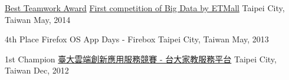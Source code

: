 

\begin{cvhonors}


  \cvhonor
    {\href{https://www.slideshare.net/evenchange4/cb102-baeir}{Best Teamwork Award}} %
    {\href{https://www.ettoday.net/events/bigdata2014/rules.php}{First competition of Big Data by ETMall}} %
    {Taipei City, Taiwan} %
    {May, 2014} %

  \cvhonor
    {4th Place} %
    {Firefox OS App Days - Firebox} %
    {Taipei City, Taiwan} %
    {May, 2013} %

  \cvhonor
    {1st Champion} %
    {\href{https://www.bnext.com.tw/article/25872/BN-ARTICLE-25872}{臺大雲端創新應用服務競賽 - 台大家教服務平台}} %
    {Taipei City, Taiwan} %
    {Dec, 2012} %

\end{cvhonors}

